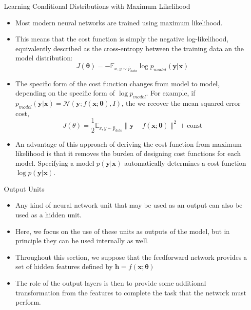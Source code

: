 \documentclass[10pt]{beamer}
\begin{document}
	\begin{frame}{Learning Conditional Distributions with Maximum Likelihood}
		\begin{itemize}
			\item Most modern neural networks are trained using maximum likelihood.
			\item This means that the cost function is simply the negative log-likelihood, equivalently described as the cross-entropy between the training data an the model distribution:
			$$J(\bm{\theta})=-\mathbb{E}_{x,y\sim\hat{p}_{data}}\log p_{model}(\bm{y}|\bm{x})$$
			\item The specific form of the cost function changes from model to model, depending on the specific form of $\log p_{model}$. For example, if $p_{model}(\bm{y}|\bm{x})=\mathcal{N}(\bm{y};f(\bm{x};\bm{\theta}),\mathit{I})$, the we recover the mean squared error cost,
			$$J(\theta)=\frac{1}{2}\mathbb{E}_{x,y\sim\hat{p}_{data}}\lVert\bm{y}-f(\bm{x};\bm{\theta})\rVert^2+\text{const}$$
			\item An advantage of this approach of deriving the cost function from maximum likelihood is that it removes the burden of designing cost functions for each model. Specifying a model $p(\bm{y}|\bm{x})$ automatically determines a cost function $\log p(\bm{y}|\bm{x})$.
		\end{itemize}
	\end{frame}
	
	\begin{frame}{Output Units}
		\begin{itemize}
			\item Any kind of neural network unit that may be used as an output can also be used as a hidden unit.
			\item Here, we focus on the use of these units as outputs of the model, but in principle they can be used internally as well.
			\item Throughout this section, we suppose that the feedforward network provides a set of hidden features defined by $\bm{h}=f(\bm{x};\bm{\theta})$
			\item The role of the output layers is then to provide some additional transformation from the features to complete the task that the network must perform.
		\end{itemize}
	\end{frame}
\end{document}
